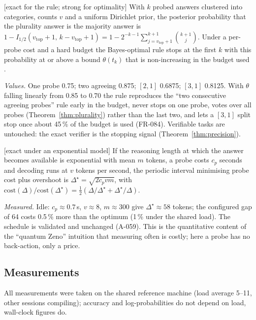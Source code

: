 \begin{proposition} \textnormal{[exact for the rule; strong for optimality]}
\label{prop:n4}
With $k$ probed answers clustered into categories, counts $v$ and a uniform
Dirichlet prior, the posterior probability that the plurality answer is the
majority answer is
$1-I_{1/2}(v_{\mathrm{top}}+1,\,k-v_{\mathrm{top}}+1)
=1-2^{-k-1}\sum_{j=v_{\mathrm{top}}+1}^{k+1}\binom{k+1}{j}$.
Under a per-probe cost and a hard budget the Bayes-optimal rule stops at the
first $k$ with this probability at or above a bound $\theta(t_k)$ that is
non-increasing in the budget used \cite{frazier2007deadline}.
\end{proposition}
\emph{Values.} One probe 0.75; two agreeing 0.875; $[2,1]$ 0.6875; $[3,1]$ 0.8125.
With $\theta$ falling linearly from 0.85 to 0.70 the rule reproduces the
``two consecutive agreeing probes'' rule early in the budget, never stops on one
probe, votes over all probes (Theorem~\ref{thm:plurality}) rather than the last
two, and lets a $[3,1]$ split stop once about 45\,\% of the budget is used
(FR-084). Verifiable tasks are untouched: the exact verifier is the stopping
signal (Theorem~\ref{thm:precision}).

\begin{proposition} \textnormal{[exact under an exponential model]}
\label{prop:n5}
If the reasoning length at which the answer becomes available is exponential
with mean $m$ tokens, a probe costs $c_p$ seconds and decoding runs at $v$
tokens per second, the periodic interval minimising probe cost plus overshoot is
$\Delta^\star=\sqrt{2c_pvm}$, with $\mathrm{cost}(\Delta)/\mathrm{cost}(\Delta^\star)
=\tfrac12(\Delta/\Delta^\star+\Delta^\star/\Delta)$.
\end{proposition}
\emph{Measured.} Idle: $c_p\approx0.7$\,s, $v\approx8$, $m\approx300$ give
$\Delta^\star\approx58$ tokens; the configured gap of 64 costs 0.5\,\% more than
the optimum (1\,\% under the shared load). The schedule is validated and
unchanged (A-059). This is the quantitative content of the ``quantum Zeno''
intuition that measuring often is costly; here a probe has no back-action, only
a price.

\subsection{Measurements}
\label{sec:phase8meas}

All measurements were taken on the shared reference machine (load average 5--11,
other sessions compiling); accuracy and log-probabilities do not depend on load,
wall-clock figures do.

